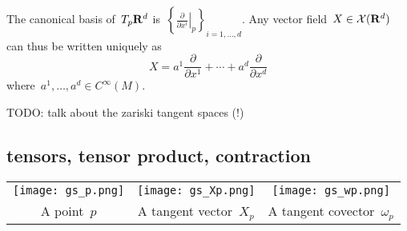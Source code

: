 The canonical basis of~$T_p\mathbf{R}^d$
is~$\displaystyle\left\{\left.\frac{\partial}{\partial
	x^i}\right|_p\right\}_{i=1,\ldots,d}$.  Any vector
	field~$X\in\mathcal{X}(\mathbf{R}^d)$ can thus be written uniquely as
\[
	X =
	a^1\frac{\partial}{\partial x^1}
	+\cdots+
	a^d\frac{\partial}{\partial x^d}
\]
where~$a^1,\ldots,a^d\in C^\infty(M)$.

TODO: talk about the zariski tangent spaces (!)

\subsection{tensors, tensor product, contraction}




\begin{tabular}{ccc}
	\texttt{[image: gs\_p.png]} &
	\texttt{[image: gs\_Xp.png]} &
	\texttt{[image: gs\_wp.png]} \\
	A point~$p$ &
	A tangent vector~$X_p$ &
	A tangent covector~$\omega_p$
\end{tabular}


